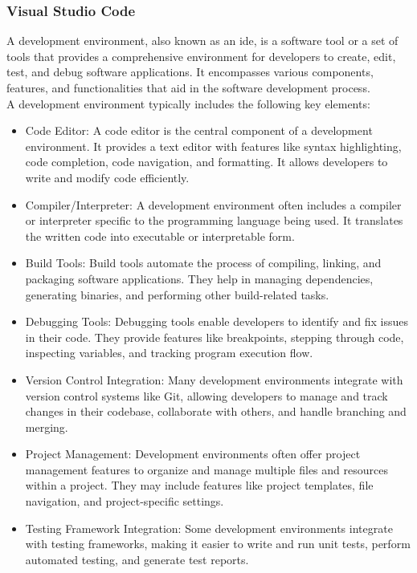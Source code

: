 \subsubsection{Visual Studio Code}
A development environment, also known as an \gls{ide}, is a software tool or a set of tools that provides a comprehensive environment for developers to create, edit, test, and debug software applications. It encompasses various components, features, and functionalities that aid in the software development process.\vspace{5mm} \\
A development environment typically includes the following key elements:
\begin{itemize}
  \item Code Editor: A code editor is the central component of a development environment. It provides a text editor with features like syntax highlighting, code completion, code navigation, and formatting. It allows developers to write and modify code efficiently.
  \item Compiler/Interpreter: A development environment often includes a compiler or interpreter specific to the programming language being used. It translates the written code into executable or interpretable form.
  \item Build Tools: Build tools automate the process of compiling, linking, and packaging software applications. They help in managing dependencies, generating binaries, and performing other build-related tasks.
  \item Debugging Tools: Debugging tools enable developers to identify and fix issues in their code. They provide features like breakpoints, stepping through code, inspecting variables, and tracking program execution flow.
  \item Version Control Integration: Many development environments integrate with version control systems like Git, allowing developers to manage and track changes in their codebase, collaborate with others, and handle branching and merging.
  \item Project Management: Development environments often offer project management features to organize and manage multiple files and resources within a project. They may include features like project templates, file navigation, and project-specific settings.
  \item Testing Framework Integration: Some development environments integrate with testing frameworks, making it easier to write and run unit tests, perform automated testing, and generate test reports.

\end{itemize}
